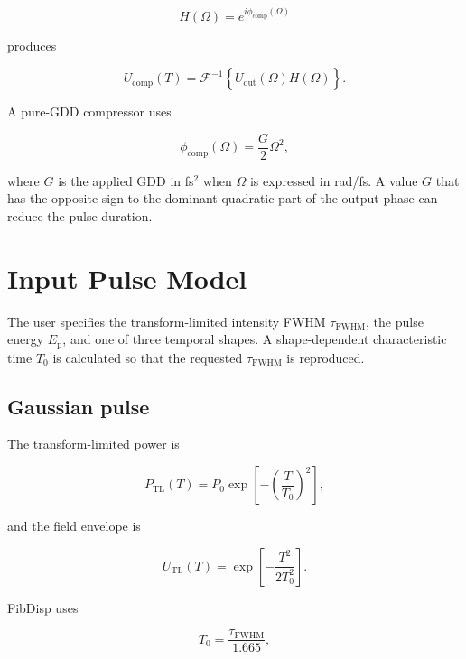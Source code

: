 \documentclass[11pt,a4paper]{article}
\newcommand{\FWHM}{\mathrm{FWHM}}
\newcommand{\TL}{\mathrm{TL}}
\begin{document}
\begin{equation}
H(\Omega)=e^{i\phi_{\mathrm{comp}}(\Omega)}
\end{equation}

produces

\begin{equation}
U_{\mathrm{comp}}(T)
=
\mathcal F^{-1}
\left\{
\widetilde U_{\mathrm{out}}(\Omega)H(\Omega)
\right\}.
\end{equation}

A pure-GDD compressor uses

\begin{equation}
\boxed{
\phi_{\mathrm{comp}}(\Omega)=\frac{G}{2}\Omega^2,
}
\end{equation}

where $G$ is the applied GDD in fs$^2$ when $\Omega$ is expressed in rad/fs.
A value $G$ that has the opposite sign to the dominant quadratic part of the
output phase can reduce the pulse duration.

\section{Input Pulse Model}

The user specifies the transform-limited intensity FWHM
$\tau_{\FWHM}$, the pulse energy $E_{\mathrm p}$, and one of three temporal
shapes. A shape-dependent characteristic time $T_0$ is calculated so that the
requested $\tau_{\FWHM}$ is reproduced.

\subsection{Gaussian pulse}

The transform-limited power is

\begin{equation}
P_{\TL}(T)=P_0\exp\left[-\left(\frac{T}{T_0}\right)^2\right],
\end{equation}

and the field envelope is

\begin{equation}
U_{\TL}(T)=\exp\left[-\frac{T^2}{2T_0^2}\right].
\end{equation}

FibDisp uses

\begin{equation}
\boxed{
T_0=\frac{\tau_{\FWHM}}{1.665},
}
\end{equation}
\end{document}
